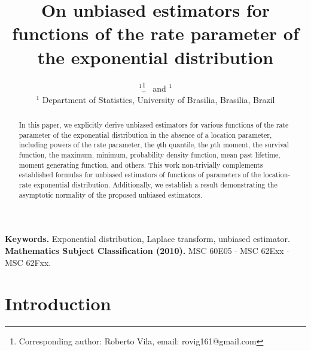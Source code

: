 \documentclass[12pt]{article}
\title{\bf
%
On unbiased estimators for functions of the rate parameter of the exponential distribution
}
\author{
\text{Roberto Vila}$^{1}$\thanks{Corresponding author: Roberto Vila, email: {rovig161@gmail.com}
}
\,\,\,and
\text{Eduardo Yoshio Nakano}$^{1}$
\\
{\small $^{1}$ Department of Statistics, University of Brasilia, Brasilia, Brazil}\\
}
\theoremstyle{definition}
\begin{document}
	\maketitle 	
	\begin{abstract}
%
In this paper, we explicitly derive unbiased estimators for various functions of the rate parameter of the exponential distribution {\color{black} in the absence of a location parameter}, including powers of the rate parameter, the 
$q$th quantile, the $p$th moment, the survival function, the maximum, minimum, probability density function, mean past lifetime, moment generating function, and others. 
{\color{black}
This work non-trivially complements established formulas for unbiased estimators of functions of parameters of the location-rate exponential distribution.
}
%
%
Additionally, we establish a result demonstrating the asymptotic normality of the proposed unbiased estimators.
	\end{abstract}
	\smallskip
	\noindent
	{\small {\bfseries Keywords.} {Exponential distribution, Laplace transform, unbiased estimator.}}
	\\
	{\small{\bfseries Mathematics Subject Classification (2010).} {MSC 60E05 $\cdot$ MSC 62Exx $\cdot$ MSC 62Fxx.}}
%	


\section{Introduction}	

	
\end{document}
